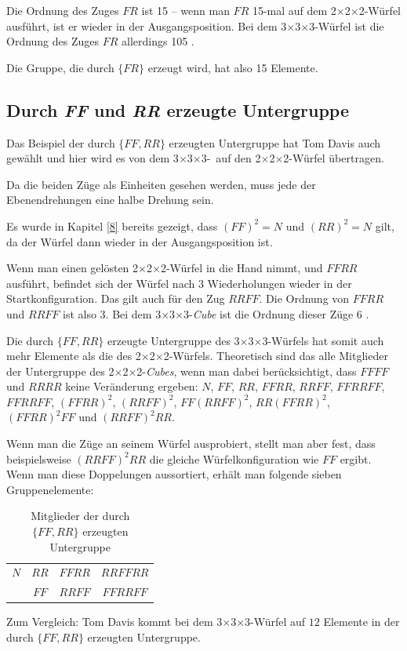 \documentclass[12pt,a4paper, usenames, dvipsnames]{article}
\newcommand{\Ttwo}{2$\times$2$\times$2-}
\newcommand{\Tthree}{3$\times$3$\times$3-}
\begin{document}
Die Ordnung des Zuges $FR$ ist 15 -- wenn man $FR$ 15-mal auf dem \Ttwo Würfel ausführt, ist er wieder in der Ausgangsposition. Bei dem \Tthree Würfel ist die Ordnung des Zuges $FR$ allerdings 105 \cite{TD}.

Die Gruppe, die durch $\{FR\}$ erzeugt wird, hat also 15 Elemente.
%
%
%
%
%
%
%
%
%
%
%
%
%
%
%
%
%
%
%

\subsection*{Durch \textit{FF} und \textit{RR} erzeugte Untergruppe}

Das Beispiel der durch $\{ FF, RR \}$ erzeugten Untergruppe hat Tom Davis auch gewählt \cite{TD} und hier wird es von dem \Tthree \ auf den \Ttwo Würfel übertragen.

Da die beiden Züge als Einheiten gesehen werden, muss jede der Ebenendrehungen eine halbe Drehung sein.

Es wurde in Kapitel \ref{8} bereits gezeigt, dass $(FF)^2 = N$ und $(RR)^2 = N$ gilt, da der Würfel dann wieder in der Ausgangsposition ist.

Wenn man einen gelösten \Ttwo Würfel in die Hand nimmt, und $FFRR$ ausführt, befindet sich der Würfel nach 3 Wiederholungen wieder in der Startkonfiguration. Das gilt auch für den Zug $RRFF$. Die Ordnung von $FFRR$ und $RRFF$ ist also 3. Bei dem \Tthree \textit{Cube} ist die Ordnung dieser Züge 6 \cite{TD}.

Die durch $\{ FF, RR \}$ erzeugte Untergruppe des \Tthree Würfels hat somit auch mehr Elemente als die des \Ttwo Würfels. Theoretisch sind das alle Mitglieder der Untergruppe des \Ttwo \textit{Cubes}, wenn man dabei berücksichtigt, dass $FFFF$ und $RRRR$ keine Veränderung ergeben: $N$, $FF$, $RR$, $FFRR$, $RRFF$, $FFRRFF$, $FFRRFF$, $(FFRR)^2$, $(RRFF)^2$, $FF(RRFF)^2$, $RR(FFRR)^2$, $(FFRR)^2FF$ und $(RRFF)^2RR$. 

Wenn man die Züge an seinem Würfel ausprobiert, stellt man aber fest, dass beispielsweise $(RRFF)^2RR$ die gleiche Würfelkonfiguration wie $FF$ ergibt. Wenn man diese Doppelungen aussortiert, erhält man folgende sieben Gruppenelemente:
\begin{table}[H]
\centering
\begin{tabular}{c c c c}
$N$ & $RR$ & $FFRR$ &  $RRFFRR$ \\
& $FF$ & $RRFF$ & $FFRRFF$   \\
\end{tabular}
\caption{Mitglieder der durch $\{ FF, RR \}$ erzeugten Untergruppe}
\end{table}
Zum Vergleich: Tom Davis kommt bei dem  \Tthree Würfel auf $12$ Elemente in der durch $\{ FF, RR \}$ erzeugten Untergruppe.
\end{document}
